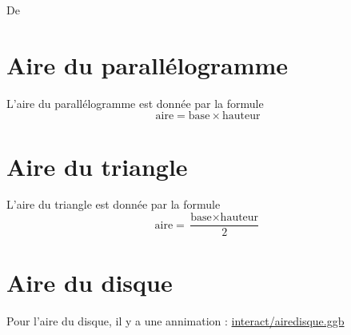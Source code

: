 


De \cite{SIUXooOJshFN}

\section{Aire du parallélogramme}


\begin{propriete}
    L'aire du parallélogramme est donnée par la formule 
    \begin{equation}
        \text{aire}=\text{base}\times \text{hauteur}
    \end{equation}
\end{propriete}



\begin{center}
   
\end{center}





\section{Aire du triangle}

\begin{propriete}
    L'aire du triangle est donnée par la formule 
    \begin{equation}
        \text{aire}=\frac{ \text{base}\times \text{hauteur}}{2}
    \end{equation}
\end{propriete}


\section{Aire du disque}


Pour l'aire du disque, il y a une annimation\cite{RHJUooRIQIuv} :
\url{interact/airedisque.ggb}


